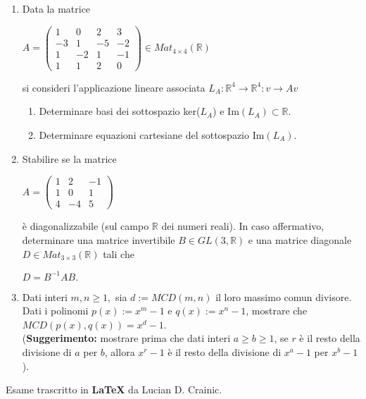 \documentclass[fleqn]{article}
\begin{document}
\begin{enumerate}
   \item Data la matrice 
   \begin{center}
   $A = \begin{pmatrix}
         1 & 0 & 2 & 3 \\
         -3 & 1 & -5 & -2 \\
         1 & -2 & 1 & -1 \\
         1 & 1 & 2 & 0
      \end{pmatrix}
      \in Mat_{4 \times 4}(\mathbb{R})$
   \end{center}
   si consideri l'applicazione lineare associata $L_A:\mathbb{R}^4 \rightarrow \mathbb{R}^4:v \rightarrow Av$
   \begin{enumerate}
      \item Determinare basi dei sottospazio ker($L_A$) e Im$(L_A)\subset \mathbb{R}$.
      \item Determinare equazioni cartesiane del sottospazio Im$(L_A)$.
   \end{enumerate}

   \item Stabilire se la matrice
   \begin{center}
      $
      A = \begin{pmatrix}
         1 & 2 & -1 \\
         1 & 0 & 1 \\
         4 & -4 & 5
      \end{pmatrix}
   $
   \end{center}
   è diagonalizzabile (sul campo $\mathbb{R}$ dei numeri reali). In caso affermativo, determinare una matrice invertibile
    $B \in GL(3,\mathbb{R})$ e una matrice diagonale $D \in Mat_{3 \times 3}(\mathbb{R})$ tali che  

   \begin{center}
      $D= B^{-1}AB.$
   \end{center}
   
   \item Dati interi $m,n \geq 1,$ sia $d := MCD(m,n)$ il loro massimo comun divisore. Dati i polinomi $p(x) := x^m-1$
   e $q(x) := x^n-1$, mostrare che  $MCD(p(x),q(x)) = x^d-1$. \\
   (\textbf{Suggerimento:} mostrare prima che dati interi 
   $a \geq b \geq 1$, se $r$ è il resto della divisione di $a$ per $b$, allora $x^r-1$ è il resto della divisione
   di $x^a-1$ per $x^b-1$).
\end{enumerate}
Esame trascritto in \textbf{\LaTeX} da Lucian D. Crainic.
\end{document}
